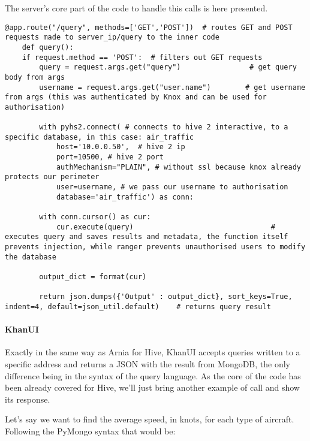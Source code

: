 \pagebreak
The server's core part of the code to handle this calls is here presented.
\\
\begin{code}
	\begin{verbatim}
@app.route("/query", methods=['GET','POST'])  # routes GET and POST requests made to server_ip/query to the inner code
    def query():
    if request.method == 'POST':  # filters out GET requests
        query = request.args.get("query")                # get query body from args
        username = request.args.get("user.name")        # get username from args (this was authenticated by Knox and can be used for authorisation)

        with pyhs2.connect( # connects to hive 2 interactive, to a specific database, in this case: air_traffic
        	host='10.0.0.50',  # hive 2 ip        
            port=10500, # hive 2 port            
            authMechanism="PLAIN", # without ssl because knox already protects our perimeter
            user=username, # we pass our username to authorisation
            database='air_traffic') as conn:
        
        with conn.cursor() as cur:                
            cur.execute(query)                                # executes query and saves results and metadata, the function itself prevents injection, while ranger prevents unauthorised users to modify the database
            
        output_dict = format(cur)

        return json.dumps({'Output' : output_dict}, sort_keys=True, indent=4, default=json_util.default)    # returns query result
	\end{verbatim}
\end{code}

\paragraph{KhanUI}

Exactly in the same way as Arnia for Hive, KhanUI accepts queries written to a specific address and returns a JSON with the result from MongoDB, the only difference being in the syntax of the query language.
As the core of the code has been already covered for Hive, we'll just bring another example of call and show its response.

Let's say we want to find the average speed, in knots, for each type of aircraft. Following the PyMongo syntax that would be:

